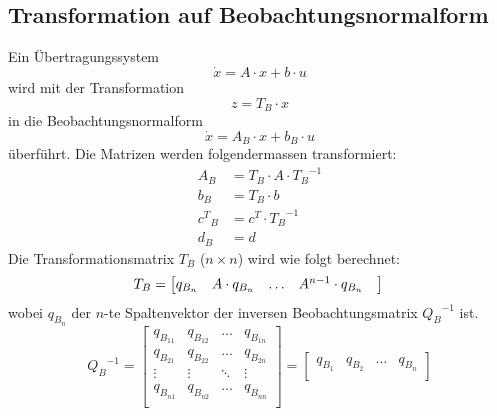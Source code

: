 \subsection{Transformation auf Beobachtungsnormalform}
Ein Übertragungssystem 
\[ \dot{x}=A\cdot x +  b \cdot u \]
wird mit der Transformation  
\[ z=T_B\cdot x \]
in die Beobachtungsnormalform
\[ \dot{x}=A_B\cdot x +  b_B \cdot u \]
überführt. Die Matrizen werden folgendermassen transformiert:
\[\begin{aligned}
	A_B &= T_B\cdot A \cdot {T_B}^{-1}	\\	
	b_B &= T_B\cdot b	\\	
	{c^T}_B &= c^T\cdot {T_B}^{-1}	\\	
	d_B &= d
\end{aligned}\]
Die Transformationsmatrix $T_B$ ($n\times n$) wird wie folgt berechnet:
\[
	T_B=
	\begin{bmatrix}
		q_{B_n} & A\cdot q_{B_n} &  \ldots & A^{n-1}\cdot q_{B_n} & \\
	\end{bmatrix}	\\
\]
wobei $q_{B_n}$ der $n$-te Spaltenvektor der inversen Beobachtungsmatrix ${Q_B}^{-1}$ ist.
\[
	{Q_B}^{-1} = \begin{bmatrix}
	 q_{B_{11}} & q_{B_{12}} & \ldots & q_{B_{1n}}\\
	 q_{B_{21}} & q_{B_{22}} & \ldots & q_{B_{2n}}\\
	 \vdots		& \vdots	 & \ddots & \vdots\\
	 q_{B_{n1}} & q_{B_{n2}} & \ldots & q_{B_{nn}}\\	 
	\end{bmatrix} =
	\begin{bmatrix}
		q_{B_1} & q_{B_2} & \ldots & q_{B_n} \\
	\end{bmatrix}	
\]


